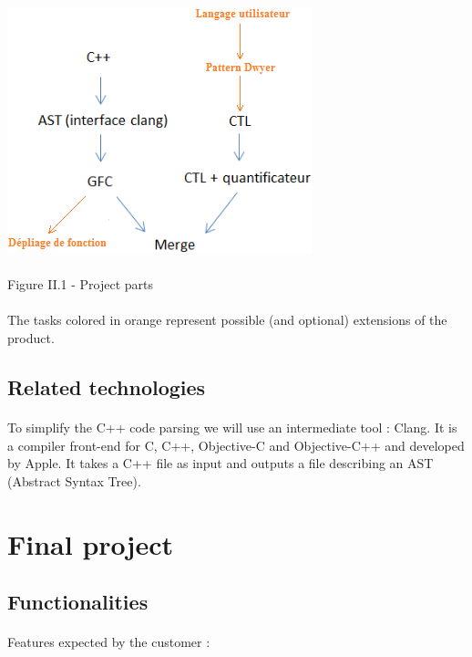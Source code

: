 \documentclass{report}
\begin{document}
\begin{center}
\includegraphics[scale=0.7]{data/tasks}
~\\~\\Figure II.1 - Project parts
\end{center}

\paragraph{}
\hspace{4mm}\textnormal{The tasks colored in orange represent possible (and optional) extensions of the product.}

\subsection{Related technologies}

\paragraph{}
\hspace{4mm}\textnormal{To simplify the C++ code parsing we will use an intermediate tool : Clang. It is a compiler front-end for C, C++, Objective-C and Objective-C++ and developed by Apple. It takes a C++ file as input and outputs a file describing an AST (Abstract Syntax Tree).}

\section{Final project}

\subsection{Functionalities}

\paragraph{}
\hspace{4mm}\textnormal{Features expected by the customer :}
\end{document}
